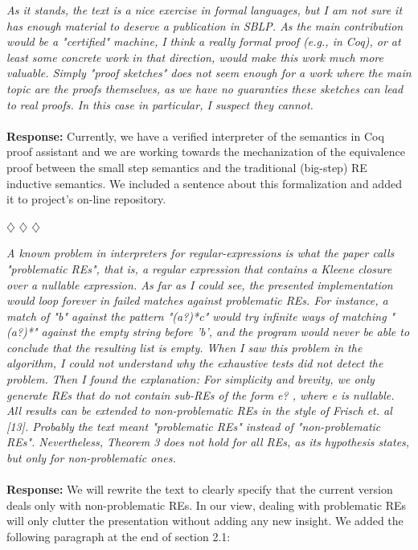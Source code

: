 \documentclass{article}
\newcommand{\separador}{\begin{center}
$\diamondsuit$ $\diamondsuit$ $\diamondsuit$
\end{center}}
\begin{document}
\noindent\textit{As it stands, the text is a nice exercise in formal languages, but I am not sure it has enough
material to deserve a publication in SBLP. As the main contribution would be a "certified" machine, I
think a really formal proof (e.g., in Coq), or at least some concrete work in that direction, would
make this work much more valuable. Simply "proof sketches" does not seem enough for a work where the
main topic are the proofs themselves, as we have no guaranties these sketches can lead to real proofs.
In this case in particular, I suspect they cannot.}
\\
\\
\noindent\textbf{Response:} Currently, we have a verified interpreter of the semantics in Coq proof assistant and we are working towards the
mechanization of the equivalence proof between the small step semantics and the traditional (big-step) RE inductive semantics.
We included a sentence about this formalization and added it to project's on-line repository.

\separador

\noindent\textit{A known problem in interpreters for regular-expressions is what the paper calls "problematic REs", that is, a
regular expression that contains a Kleene closure over a nullable expression. As far as I could see, the presented
implementation would loop forever in failed matches against problematic REs. For instance, a match of "b" against the pattern
"(a?)*c" would try infinite ways of matching "(a?)*" against the empty string before 'b', and the program would never be able
to conclude that the resulting list is empty. When I saw this problem in the algorithm, I could not understand why the exhaustive
tests did not detect the problem. Then I found the explanation:
For simplicity and brevity, we only generate REs that do not contain sub-REs of the form e? , where e is nullable. All results
can be extended to non-problematic REs in the style of Frisch et. al [13].
Probably the text meant "problematic REs" instead of "non-problematic
REs".  Nevertheless, Theorem 3 does not hold for all REs, as its
hypothesis states, but only for non-problematic ones.}
\\
\\
\noindent\textbf{Response:} We will rewrite the text to clearly specify that the current version deals only with non-problematic REs. In our view, dealing with
problematic REs will only clutter the presentation without adding any new insight. We added the following paragraph at the end of section 2.1:
\end{document}
